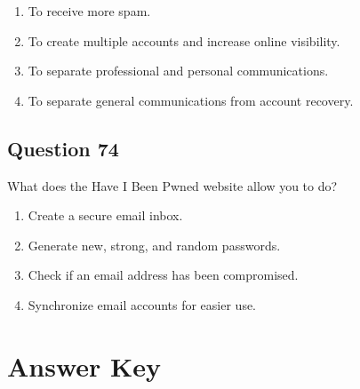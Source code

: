 \documentclass[12pt,a4paper]{article}
\begin{document}
\begin{enumerate}[label=\Alph*., leftmargin=*]
\item To receive more spam.
\item To create multiple accounts and increase online visibility.
\item To separate professional and personal communications.
\item To separate general communications from account recovery.
\end{enumerate}

\bigskip


\subsection*{Question 74}
What does the Have I Been Pwned website allow you to do?

\begin{enumerate}[label=\Alph*., leftmargin=*]
\item Create a secure email inbox.
\item Generate new, strong, and random passwords.
\item Check if an email address has been compromised.
\item Synchronize email accounts for easier use.
\end{enumerate}

\bigskip


\newpage
\section*{Answer Key}
\end{document}
